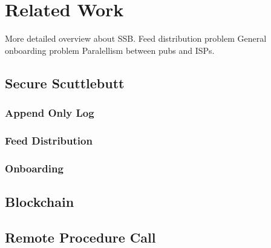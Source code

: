 \chapter{Related Work}
More detailed overview about SSB.
Feed distribution problem
General onboarding problem
Paralellism between pubs and ISPs.
\section{Secure Scuttlebutt}
\subsection{Append Only Log}
\subsection{Feed Distribution}
\subsection{Onboarding}
\section{Blockchain}
\section{Remote Procedure Call}